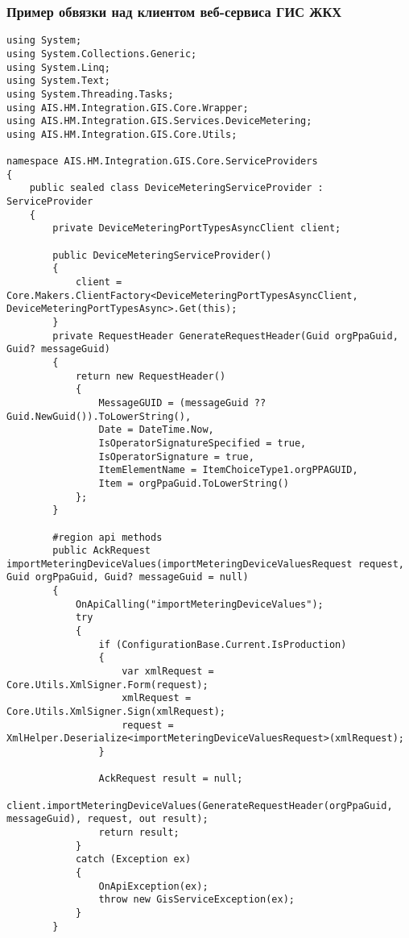 
\subsubsection*{Пример обвязки над клиентом веб-сервиса ГИС ЖКХ}
\begin{lstlisting}
using System;
using System.Collections.Generic;
using System.Linq;
using System.Text;
using System.Threading.Tasks;
using AIS.HM.Integration.GIS.Core.Wrapper;
using AIS.HM.Integration.GIS.Services.DeviceMetering;
using AIS.HM.Integration.GIS.Core.Utils;

namespace AIS.HM.Integration.GIS.Core.ServiceProviders
{
    public sealed class DeviceMeteringServiceProvider : ServiceProvider
    {
        private DeviceMeteringPortTypesAsyncClient client;

        public DeviceMeteringServiceProvider()
        {
            client = Core.Makers.ClientFactory<DeviceMeteringPortTypesAsyncClient, DeviceMeteringPortTypesAsync>.Get(this);
        }
        private RequestHeader GenerateRequestHeader(Guid orgPpaGuid, Guid? messageGuid)
        {
            return new RequestHeader()
            {
                MessageGUID = (messageGuid ?? Guid.NewGuid()).ToLowerString(),
                Date = DateTime.Now,
                IsOperatorSignatureSpecified = true,
                IsOperatorSignature = true,
                ItemElementName = ItemChoiceType1.orgPPAGUID,
                Item = orgPpaGuid.ToLowerString()
            };
        }

        #region api methods
        public AckRequest importMeteringDeviceValues(importMeteringDeviceValuesRequest request, Guid orgPpaGuid, Guid? messageGuid = null)
        {
            OnApiCalling("importMeteringDeviceValues");
            try
            {
                if (ConfigurationBase.Current.IsProduction)
                {
                    var xmlRequest = Core.Utils.XmlSigner.Form(request);
                    xmlRequest = Core.Utils.XmlSigner.Sign(xmlRequest);
                    request = XmlHelper.Deserialize<importMeteringDeviceValuesRequest>(xmlRequest);
                }

                AckRequest result = null;
                client.importMeteringDeviceValues(GenerateRequestHeader(orgPpaGuid, messageGuid), request, out result);
                return result;
            }
            catch (Exception ex)
            {
                OnApiException(ex);
                throw new GisServiceException(ex);
            }
        }


\end{lstlisting}
